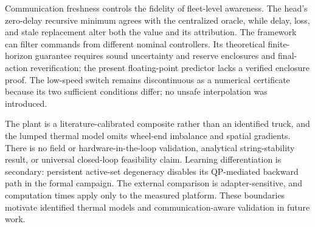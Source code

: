 Communication freshness controls the fidelity of fleet-level awareness. The head's zero-delay recursive minimum agrees with the centralized oracle, while delay, loss, and stale replacement alter both the value and its attribution. The framework can filter commands from different nominal controllers. Its theoretical finite-horizon guarantee requires sound uncertainty and reserve enclosures and final-action reverification; the present floating-point predictor lacks a verified enclosure proof. The low-speed switch remains discontinuous as a numerical certificate because its two sufficient conditions differ; no unsafe interpolation was introduced.

The plant is a literature-calibrated composite rather than an identified truck, and the lumped thermal model omits wheel-end imbalance and spatial gradients. There is no field or hardware-in-the-loop validation, analytical string-stability result, or universal closed-loop feasibility claim. Learning differentiation is secondary: persistent active-set degeneracy disables its QP-mediated backward path in the formal campaign. The external comparison is adapter-sensitive, and computation times apply only to the measured platform. These boundaries motivate identified thermal models and communication-aware validation in future work.
